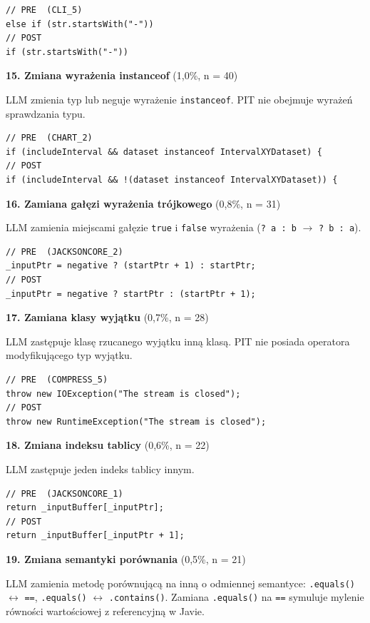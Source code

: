 \documentclass[12pt,a4paper,oldfontcommands]{memoir}
\theoremstyle{plain}
\theoremstyle{definition}
\theoremstyle{remark}
\begin{document}
    \begin{lstlisting}
// PRE  (CLI_5)
else if (str.startsWith("-"))
// POST
if (str.startsWith("-"))
    \end{lstlisting}

    \textbf{15. Zmiana wyrażenia instanceof} (1,0\%, n = 40)

    LLM zmienia typ lub neguje wyrażenie \texttt{instanceof}.
    PIT nie obejmuje wyrażeń sprawdzania typu.

    \begin{lstlisting}
// PRE  (CHART_2)
if (includeInterval && dataset instanceof IntervalXYDataset) {
// POST
if (includeInterval && !(dataset instanceof IntervalXYDataset)) {
    \end{lstlisting}

    \textbf{16. Zamiana gałęzi wyrażenia trójkowego} (0,8\%, n = 31)

    LLM zamienia miejscami gałęzie \texttt{true} i \texttt{false} wyrażenia (\texttt{? a : b} $\rightarrow$ \texttt{? b : a}).

    \begin{lstlisting}
// PRE  (JACKSONCORE_2)
_inputPtr = negative ? (startPtr + 1) : startPtr;
// POST
_inputPtr = negative ? startPtr : (startPtr + 1);
    \end{lstlisting}

    \textbf{17. Zamiana klasy wyjątku} (0,7\%, n = 28)

    LLM zastępuje klasę rzucanego wyjątku inną klasą.
    PIT nie posiada operatora modyfikującego typ wyjątku.

    \begin{lstlisting}
// PRE  (COMPRESS_5)
throw new IOException("The stream is closed");
// POST
throw new RuntimeException("The stream is closed");
    \end{lstlisting}

    \textbf{18. Zmiana indeksu tablicy} (0,6\%, n = 22)

    LLM zastępuje jeden indeks tablicy innym.

    \begin{lstlisting}
// PRE  (JACKSONCORE_1)
return _inputBuffer[_inputPtr];
// POST
return _inputBuffer[_inputPtr + 1];
    \end{lstlisting}

    \textbf{19. Zmiana semantyki porównania} (0,5\%, n = 21)

    LLM zamienia metodę porównującą na inną o odmiennej semantyce: \texttt{.equals()} $\leftrightarrow$ \texttt{==}, \texttt{.equals()} $\leftrightarrow$ \texttt{.contains()}.
    Zamiana \texttt{.equals()} na \texttt{==} symuluje mylenie równości wartościowej z referencyjną w Javie.
\end{document}

